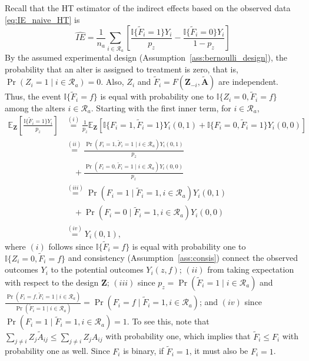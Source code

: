 \documentclass[11pt]{article}
\theoremstyle{definition}
\def \bZ {\boldsymbol{Z}}
\def \bA {\boldsymbol{A}}
\def \cR {\mathcal{R}}
\def \EX {\mathbb{E}}
\begin{document}
Recall that the HT estimator of the indirect effects based on the observed data \eqref{eq:IE_naive_HT} is
\begin{equation*}
    \widehat{IE} = 
    \frac{1}{n_a}
    \sum_{i \in \cR_a}
    \left[
    \frac{
    \mathbb{I}\{\widetilde{F}_i=1\}Y_i}{p_z} 
    -
    \frac{
    \mathbb{I}\{\widetilde{F}_i=0\}Y_i}{1 - p_z} 
    \right]
\end{equation*}
By the assumed experimental design (Assumption~\ref{ass:bernoulli_design}), the probability that an alter is assigned to treatment is zero,
 that is, $\Pr(Z_i =1 \mid i\in \cR_a)=0$. Also, $Z_i$ and $\widetilde{F}_i = F(\bZ_{-i},\widetilde{\bA})$ are independent. Thus, the event $\mathbb{I}\{\widetilde{F}_i=f\}$ is equal with probability one to  $\mathbb{I}\{Z_i=0,\widetilde{F}_i=f\}$ among the alters $i \in \cR_a$.
Starting with the first inner term, for $i \in \cR_a$,
\begin{equation}
    \label{apdx.eq:alter_0_1}
    \begin{aligned}        
    \EX_{\bZ}\left[\frac{
    \mathbb{I}\{\widetilde{F}_i=1\}Y_i}{p_z} \right]
    &\overset{(i)}{=}
     \frac{1}{p_z}
     \EX_{\bZ}
     \left[
    \mathbb{I}\{F_i=1,\widetilde{F}_i=1\}Y_i(0,1) 
    +
    \mathbb{I}\{F_i=0,\widetilde{F}_i=1\}Y_i(0,0) 
    \right]
    \\ &\overset{(ii)}{=}
    \frac{\Pr(F_i=1, \widetilde{F}_i=1 \mid i \in \cR_a)Y_i(0,1)}{p_z}
    \\ &\quad + 
    \frac{\Pr(F_i=0, \widetilde{F}_i=1 \mid i \in \cR_a)Y_i(0,0)}{p_z}
    \\ &\overset{(iii)}{=}
    \Pr(F_i = 1 \mid \widetilde{F}_i=1, i\in \cR_a) Y_i(0,1)
    \\ &\quad +
    \Pr(F_i = 0 \mid \widetilde{F}_i=1, i\in \cR_a) Y_i(0,0)
    \\ &\overset{(iv)}{=}
    Y_i(0,1),
    \end{aligned}
\end{equation}
where $(i)$ follows since $\mathbb{I}\{\widetilde{F}_i=f\}$ is
 equal with probability one to  $\mathbb{I}\{Z_i=0,\widetilde{F}_i=f\}$ 
 and consistency (Assumption~\ref{ass:consis}) connect the observed outcomes $Y_i$ to the potential outcomes $Y_i(z,f)$; $(ii)$ from taking expectation with respect to the design $\bZ$; $(iii)$ since $p_z = \Pr(\widetilde{F}_i=1\mid i \in \cR_a)$ and $\frac{\Pr(F_i=f, \widetilde{F}_i=1 \mid i \in \cR_a)}{\Pr(\widetilde{F}_i=1\mid i \in \cR_a)} = \Pr(F_i = f \mid \widetilde{F}_i=1, i\in \cR_a)$; and $(iv)$ since $\Pr(F_i=1 \mid \widetilde{F}_i=1, i \in \cR_a) = 1$. To see this, note that $\sum_{j\neq i}Z_j \widetilde{A}_{ij} \leq \sum_{j\neq i}Z_j A_{ij} $ with probability one, which implies that $\widetilde{F}_i \leq F_i$ with probability one as well. Since $F_i$ is binary, if $\widetilde{F}_i=1$, it must also be $F_i=1$.
\end{document}
